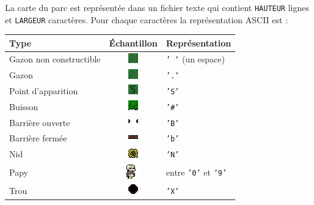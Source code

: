 La carte du parc est représentée dans un fichier texte qui contient \texttt{HAUTEUR} lignes et \texttt{LARGEUR} caractères. Pour chaque caractères la représentation ASCII est :
\begin{center}
    \begin{tabular}{l|c|l}
        \hline
        \textbf{Type} & \textbf{Échantillon} & \textbf{Représentation} \\
        \hline
        Gazon non constructible & \includegraphics[width=.5cm]{img/sprite/grass.png} & \texttt{' '} (un espace) \\
        Gazon & \includegraphics[width=.5cm]{img/sprite/grass.png} & \texttt{'.'} \\
        Point d’apparition & \includegraphics[width=.5cm]{img/sprite/spawn.png} & \texttt{'S'} \\
        Buisson & \includegraphics[width=.5cm]{img/sprite/buisson.png} & \texttt{'\#'} \\
        Barrière ouverte & \includegraphics[width=.5cm]{img/sprite/gate.png} & \texttt{'B'} \\
        Barrière fermée & \includegraphics[width=.5cm]{img/sprite/gate_close.png} & \texttt{'b'} \\
        Nid & \includegraphics[width=.5cm]{img/sprite/nest_empty.png} & \texttt{'N'} \\
        Papy & \includegraphics[width=.5cm]{img/sprite/papy.png} & entre \texttt{'0'} et \texttt{'9'} \\
        Trou & \includegraphics[width=.5cm]{img/sprite/trou.png} & \texttt{'X'} \\
        \hline
    \end{tabular}
\end{center}

